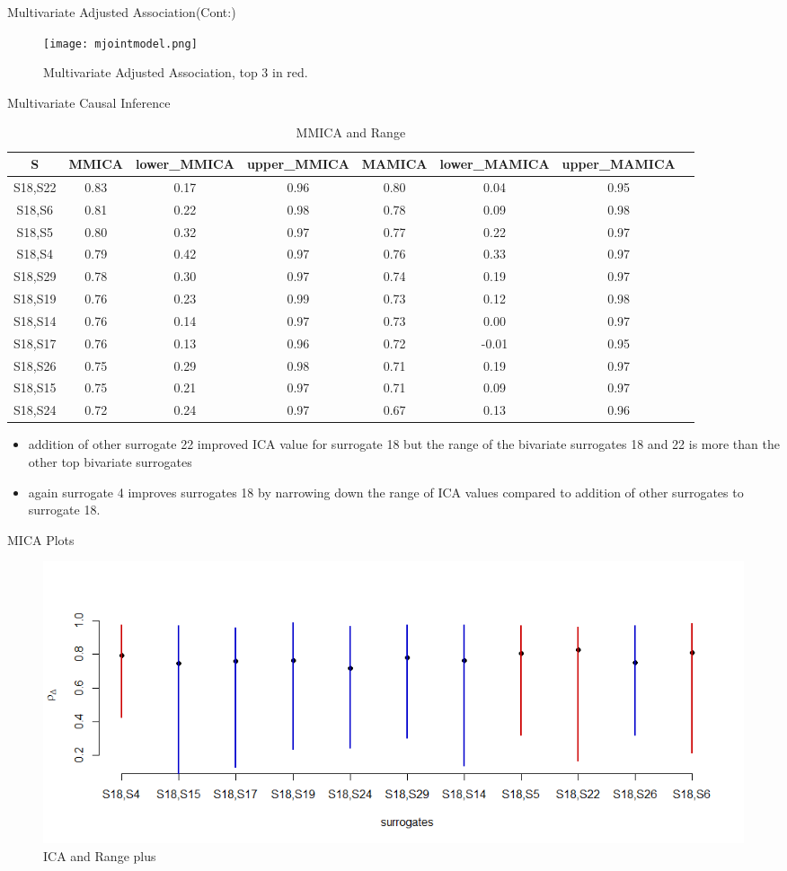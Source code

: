 \documentclass[a4paper,9pt]{beamer}\usepackage[]{graphicx}\usepackage[]{color}
\begin{document}
\begin{frame}{Multivariate Adjusted Association(Cont:)}

\begin{figure}[H]
\texttt{[image: mjointmodel.png]}
\caption{\tiny Multivariate Adjusted Association, top 3 in red.}
\end{figure}
\end{frame}

\begin{frame}{Multivariate Causal Inference}
\tiny
\begin{table}[H]
\centering
\begin{tabular}{cccccccc}
  \hline
S & MMICA & lower\_MMICA & upper\_MMICA & MAMICA & lower\_MAMICA & upper\_MAMICA \\ 
  \hline
\alert{S18,S22} & 0.83 & 0.17 & 0.96 & 0.80 & 0.04 & 0.95 \\ 
\alert{S18,S6} & 0.81 & 0.22 & 0.98 & 0.78 & 0.09 & 0.98 \\ 
\alert{S18,S5} & 0.80 & 0.32 & 0.97 & 0.77 & 0.22 & 0.97 \\ 
\alert{S18,S4} & 0.79 & 0.42 & 0.97 & 0.76 & 0.33 & 0.97 \\ 
S18,S29 & 0.78 & 0.30 & 0.97 & 0.74 & 0.19 & 0.97 \\ 
S18,S19 & 0.76 & 0.23 & 0.99 & 0.73 & 0.12 & 0.98 \\ 
S18,S14 & 0.76 & 0.14 & 0.97 & 0.73 & 0.00 & 0.97 \\ 
S18,S17 & 0.76 & 0.13 & 0.96 & 0.72 & -0.01 & 0.95 \\ 
S18,S26 & 0.75 & 0.29 & 0.98 & 0.71 & 0.19 & 0.97 \\ 
S18,S15 & 0.75 & 0.21 & 0.97 & 0.71 & 0.09 & 0.97 \\ 
S18,S24 & 0.72 & 0.24 & 0.97 & 0.67 & 0.13 & 0.96 \\ 
   \hline
\end{tabular}
\caption{MMICA and Range}
\end{table}

\tiny
\begin{itemize}
\item addition of other surrogate 22 improved ICA value for surrogate 18 but the range of the bivariate surrogates 18 and 22 is more than the other top bivariate surrogates
\item again surrogate 4 improves surrogates 18 by narrowing down the range of ICA values compared to addition of other surrogates to surrogate 18. 
\end{itemize}

\end{frame}

\begin{frame}{MICA Plots}
\begin{figure}[H]
\includegraphics[scale=0.35]{MICAplot.png}
\caption{\tiny ICA and Range plus}
\end{figure}
\end{frame}
\end{document}
